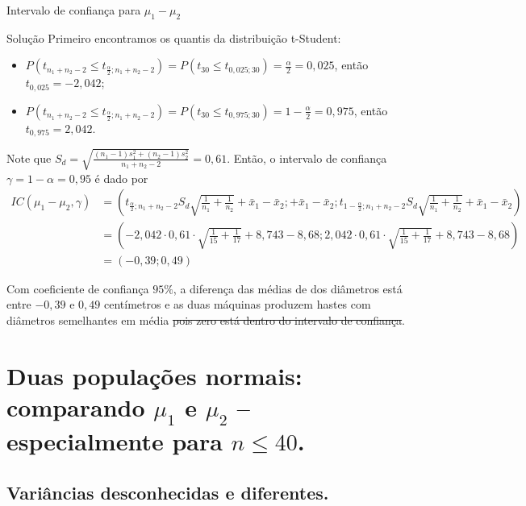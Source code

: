 \documentclass[9pt]{beamer}
\begin{document}
\begin{frame}{Intervalo de confiança para $\mu_1 - \mu_2$}

\small
\begin{block}{Solução}
	Primeiro encontramos os quantis da distribuição t-Student:
	\begin{itemize}
		\item $P(t_{n_1+n_2-2} \leq t_{\frac{\alpha}{2}; n_1+n_2-2}) = P(t_{30} \leq t_{0,025; 30}) = \frac{\alpha}{2} = 0,025$, então $t_{0,025} =-2,042$;
		\item $P(t_{n_1+n_2-2} \leq t_{\frac{\alpha}{2}; n_1+n_2-2}) = P(t_{30} \leq t_{0,975; 30}) =1- \frac{\alpha}{2} = 0,975$, então $t_{0,975} =2,042$.
	\end{itemize}	

	Note que $S_d =\sqrt{ \frac{(n_1 - 1) s_1^2 + (n_2 -1)s_2^2}{n_1+n_2-2}} = 0,61$. Então, o intervalo de confiança $\gamma=1-\alpha = 0,95$ é dado por
	{\scriptsize
	\begin{align*}
		IC(\mu_1 - \mu_2, \gamma) &= \left( t_{\frac{\alpha}{2};n_1+n_2-2} S_d \sqrt{\frac{1}{n_1} + \frac{1}{n_2}}   + \bar{x}_1- \bar{x}_2; + \bar{x}_1- \bar{x}_2; t_{1-\frac{\alpha}{2};n_1+n_2-2} S_d \sqrt{\frac{1}{n_1} + \frac{1}{n_2}} + \bar{x}_1- \bar{x}_2  \right)\\
		&= \left( -2,042\cdot 0,61\cdot \sqrt{\frac{1}{15} + \frac{1}{17}} + 8,743 - 8,68; 2,042\cdot 0,61\cdot \sqrt{\frac{1}{15} + \frac{1}{17}} + 8,743 - 8,68  \right)\\
		&= \left( -0,39; 0,49 \right)
	\end{align*}
	}

	Com coeficiente de confiança $95\%$, a diferença das médias de dos diâmetros está entre $-0,39$ e $0,49$ centímetros e as duas máquinas produzem hastes com diâmetros semelhantes em média \sout{pois zero está dentro do intervalo de confiança}.
\end{block}
\normalsize

\end{frame}

\section{Duas populações normais: comparando $\mu_1$ e $\mu_2$ -- especialmente para $n \leq 40$.}

\subsection{Variâncias desconhecidas e diferentes.}
\end{document}
